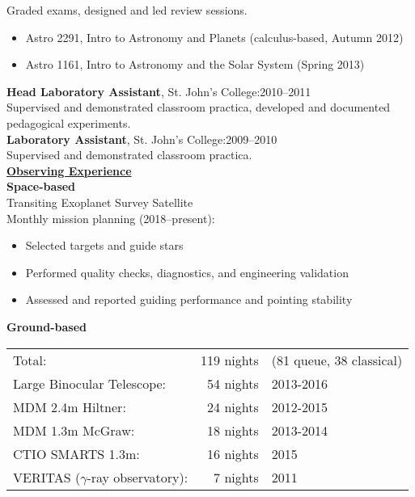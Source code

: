 \documentclass[letterpaper,11pt]{article}
\begin{document}
\indent Graded exams, designed and led review sessions.
\begin{itemize}[nosep, label=\textbullet]
\item Astro 2291,  Intro to Astronomy and Planets (calculus-based, Autumn 2012)
\item Astro 1161,  Intro to Astronomy and the Solar System (Spring 2013)
\end{itemize}
\textbf{Head Laboratory Assistant}, St. John's College:\hfill2010--2011\\
\indent Supervised and demonstrated classroom practica, developed and documented\\
 \indent  pedagogical experiments.\\
\textbf{Laboratory Assistant}, St. John's College:\hfill2009--2010\\
\indent Supervised and demonstrated classroom practica.\\
\clearpage
\noindent \underline{\textbf{Observing Experience}}\\
\textbf{Space-based}\\
Transiting Exoplanet Survey Satellite\\
\indent Monthly mission planning (2018--present):
\begin{itemize}[nosep,label=\textbullet]
\item Selected targets and guide stars
\item Performed quality checks, diagnostics, and engineering validation
\item Assessed and reported guiding performance and pointing stability
\end{itemize}
\textbf{Ground-based}\\
\begin{tabular}[t]{lrl}
Total:&                                        119 nights& (81 queue, 38 classical)\\
Large Binocular Telescope:&       54 nights& 2013-2016\\
MDM 2.4m Hiltner:&                   24 nights& 2012-2015\\
MDM 1.3m McGraw: &               18 nights& 2013-2014\\
CTIO SMARTS 1.3m: &              16 nights& 2015\\
VERITAS ($\gamma$-ray observatory): &   7 nights& 2011   \\ 
\end{tabular}
\\
\\
\end{document}

